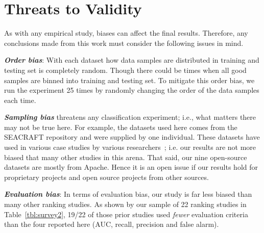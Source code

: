 \documentclass[10pt,conference]{IEEEtran}
\theoremstyle{break}
\theoremstyle{break}
\begin{document}
\section{Threats to Validity}
\label{sect:validity}

As with any empirical study, biases can affect the final
results. Therefore, any conclusions made from this work must consider the following issues in mind.

\textbf{\textit{Order bias}}: With each dataset how data samples are distributed in training and testing set is completely random. Though there could be times when all good samples are binned into training and testing set. To mitigate this order bias, we run
the experiment 25 times by randomly changing the order of the data samples each time.

\textbf{\textit{Sampling bias}} threatens any classification experiment; i.e., what matters there may not be true here. For example, the datasets used here comes from the SEACRAFT repository and were supplied by one individual. These datasets have used in various case studies by various researchers~\cite{he2012investigation,peters2013better,peters2013balancing,turhan2013empirical}; i.e. our results are not more biased that many other studies in this arena.
That said, our nine open-source datasets   are mostly from Apache. Hence
it is an open issue if our results hold for
 proprietary projects and open source projects from other sources.


\textbf{\textit{Evaluation bias}}: In terms of evaluation bias,
our study is far less biased than many other ranking studies.  As shown by our sample of
22 ranking studies in
Table~\ref{tbl:survey2}, 19/22 of those prior studies used {\em fewer} evaluation criteria
than the four reported here (AUC, recall, precision and false alarm). 
\end{document}
